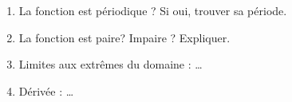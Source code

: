 \begin{exercice}
\begin{enumerate}
\begin{enumerate}
        \vspace{3mm}
      \item La fonction est périodique ? Si oui, trouver sa période.  
        \vspace{3mm}
      \item La fonction est paire? Impaire ? Expliquer.  
        \vspace{1cm}
      \item Limites aux extrêmes du domaine : \ldots
        \vspace{1cm}
      \item Dérivée : \ldots 
        \vspace{3mm}
      \end{enumerate}      
    \end{enumerate}


\end{exercice}
